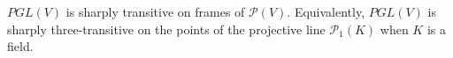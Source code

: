 $PGL(V)$ is sharply transitive on frames of $\mathcal{P}(V)$. Equivalently, $PGL(V)$ is sharply three-transitive on the points of the projective line $\mathcal{P}_1(K)$ when $K$ is a field.
